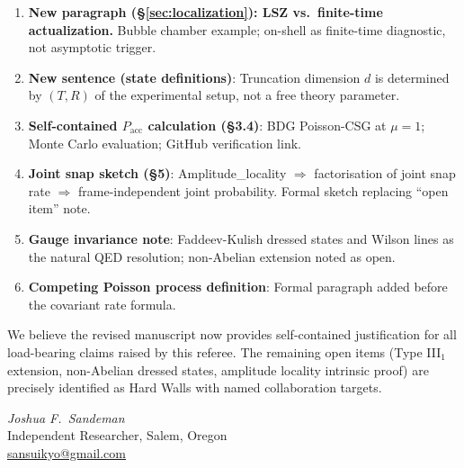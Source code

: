 \documentclass[11pt]{article}
\begin{document}
\begin{enumerate}[itemsep=4pt]

\item \textbf{New paragraph (\S\ref{sec:localization}): LSZ vs.\ finite-time
actualization.} Bubble chamber example; on-shell as finite-time diagnostic,
not asymptotic trigger.

\item \textbf{New sentence (state definitions)}: Truncation dimension $d$
is determined by $(T,R)$ of the experimental setup, not a free theory
parameter.

\item \textbf{Self-contained $P_{\mathrm{acc}}$ calculation (\S3.4)}:
BDG Poisson-CSG at $\mu=1$; Monte Carlo evaluation; GitHub verification link.

\item \textbf{Joint snap sketch (\S5)}: Amplitude\_locality $\Rightarrow$
factorisation of joint snap rate $\Rightarrow$ frame-independent joint
probability. Formal sketch replacing ``open item'' note.

\item \textbf{Gauge invariance note}: Faddeev-Kulish dressed states and
Wilson lines as the natural QED resolution; non-Abelian extension noted
as open.

\item \textbf{Competing Poisson process definition}: Formal paragraph
added before the covariant rate formula.

\end{enumerate}

\bigskip\noindent
We believe the revised manuscript now provides self-contained justification
for all load-bearing claims raised by this referee. The remaining
open items (Type III$_1$ extension, non-Abelian dressed states, amplitude
locality intrinsic proof) are precisely identified as Hard Walls with named
collaboration targets.

\bigskip
\noindent
\textit{Joshua F.\ Sandeman}\\
Independent Researcher, Salem, Oregon\\
\href{mailto:sansuikyo@gmail.com}{sansuikyo@gmail.com}
\end{document}
